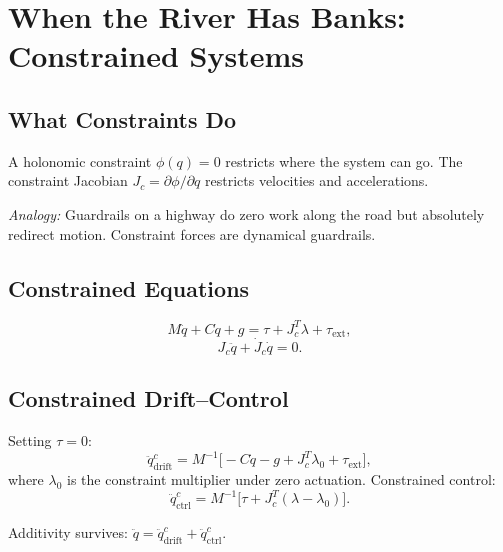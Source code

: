 \documentclass[11pt]{article}
\begin{document}
\section{When the River Has Banks: Constrained Systems}\label{sec:constrained}

\subsection{What Constraints Do}

A holonomic constraint $\phi(q) = 0$ restricts where the system can go. The constraint Jacobian $J_c = \partial\phi/\partial q$ restricts velocities and accelerations.

\textit{Analogy:} Guardrails on a highway do zero work along the road but absolutely redirect motion. Constraint forces are dynamical guardrails.

\subsection{Constrained Equations}

\begin{equation}\label{eq:cel-dynamics}
M\ddot{q} + C\dot{q} + g = \tau + J_c^T\lambda + \tau_{\mathrm{ext}},
\end{equation}
\begin{equation}\label{eq:cel-constraint}
J_c\ddot{q} + \dot{J}_c\dot{q} = 0.
\end{equation}

\subsection{Constrained Drift--Control}

Setting $\tau=0$:
\begin{equation}\label{eq:constrained-drift}
\ddot{q}_{\mathrm{drift}}^{c} = M^{-1}\bigl[-C\dot{q}-g+J_c^T\lambda_0+\tau_{\mathrm{ext}}\bigr],
\end{equation}
where $\lambda_0$ is the constraint multiplier under zero actuation. Constrained control:
\begin{equation}\label{eq:constrained-ctrl}
\ddot{q}_{\mathrm{ctrl}}^{c} = M^{-1}\bigl[\tau+J_c^T(\lambda-\lambda_0)\bigr].
\end{equation}

Additivity survives: $\ddot{q} = \ddot{q}_{\mathrm{drift}}^{c} + \ddot{q}_{\mathrm{ctrl}}^{c}$.
\end{document}
